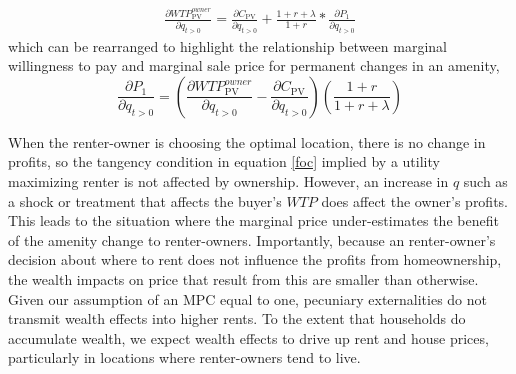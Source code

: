 \documentclass[ecta,nameyear,draft]{econsocart}
\theoremstyle{plain}
\theoremstyle{remark}
\begin{document}
\begin{eqnarray}
	\frac{\partial \mathit{WTP}^{\mathit{owner}}_{\mathrm{PV}}}{\partial q_{t>0}} =	\frac{\partial C_{\mathrm{PV}}}{\partial q_{t>0}}+\frac{1+r+\lambda}{1+r}*\frac{\partial P_1}{\partial q_{t>0}}
\end{eqnarray}
which can be rearranged to highlight the relationship between marginal willingness to pay and marginal sale price for permanent changes in an amenity,
\begin{equation}
	\frac{\partial P_1} {\partial q_{t>0}}=\left(
	\frac{\partial \mathit{WTP}^{\mathit{owner}}_{\mathrm{PV}}}{\partial q_{t>0}}-\frac{\partial C_{\mathrm{PV}}}{\partial q_{t>0}}\right)\left(\frac{1+r}{1+r+\lambda}\right)
\end{equation}

When the renter-owner is choosing the optimal location, there is no change in profits, so the tangency condition in equation \ref{foc} implied by a utility maximizing renter is not affected by ownership. However, an increase in $q$ such as a shock or treatment that affects the buyer's $WTP$ does affect the owner's profits. This leads to the situation where the marginal price under-estimates the benefit of the amenity change to renter-owners. Importantly, because an renter-owner's decision about where to rent does not influence the profits from homeownership, the wealth impacts on price that result from this are smaller than otherwise. Given our assumption of an MPC equal to one, pecuniary externalities do not transmit wealth effects into higher rents. To the extent that households do accumulate wealth, we expect wealth effects to drive up rent and house prices, particularly in locations where renter-owners tend to live.
\end{document}
